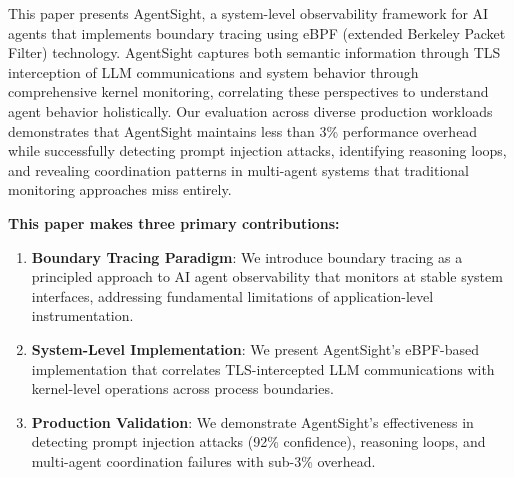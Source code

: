 This paper presents AgentSight, a system-level observability framework for AI agents that implements boundary tracing using eBPF (extended Berkeley Packet Filter) technology. AgentSight captures both semantic information through TLS interception of LLM communications and system behavior through comprehensive kernel monitoring, correlating these perspectives to understand agent behavior holistically. Our evaluation across diverse production workloads demonstrates that AgentSight maintains less than 3\% performance overhead while successfully detecting prompt injection attacks, identifying reasoning loops, and revealing coordination patterns in multi-agent systems that traditional monitoring approaches miss entirely.

\textbf{This paper makes three primary contributions:}

\begin{enumerate}
\item \textbf{Boundary Tracing Paradigm}: We introduce boundary tracing as a principled approach to AI agent observability that monitors at stable system interfaces, addressing fundamental limitations of application-level instrumentation.

\item \textbf{System-Level Implementation}: We present AgentSight's eBPF-based implementation that correlates TLS-intercepted LLM communications with kernel-level operations across process boundaries.

\item \textbf{Production Validation}: We demonstrate AgentSight's effectiveness in detecting prompt injection attacks (92\% confidence), reasoning loops, and multi-agent coordination failures with sub-3\% overhead.
\end{enumerate}
